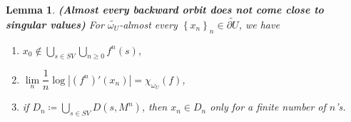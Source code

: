 \documentclass[11pt]{article}
\newtheorem{sublemma}[claim]{Lemma}
\theoremstyle{definition}
\theoremstyle{remark}
\theoremstyle{plain}
\begin{document}
				\begin{sublemma}{\bf (Almost every backward orbit does not come close to singular values)}
			For $ \widetilde{\omega_U} $-almost every $ \left\lbrace x_n\right\rbrace _n\in\widetilde{\partial U} $, we have \begin{enumerate}[label={\em (1.\arabic*)}]
			\item\label{lemma2a} $ x_0 \notin \bigcup\limits_{s\in SV} \bigcup\limits_{n\geq0}f^n(s)$,
			\item\label{lemma2b} $ \lim\limits_{n}\dfrac{1}{n}\log \left| (f^n)'(x_n)\right| =\chi_{\omega_U}(f)$,
						\item\label{lemma2c} if  $ D_n\coloneqq \bigcup\limits_{s\in SV} D(s,  M^n) $, then $ x_n\in D_n$ only for a finite number of $ n $'s.
			\end{enumerate}
		\end{sublemma}
\end{document}
